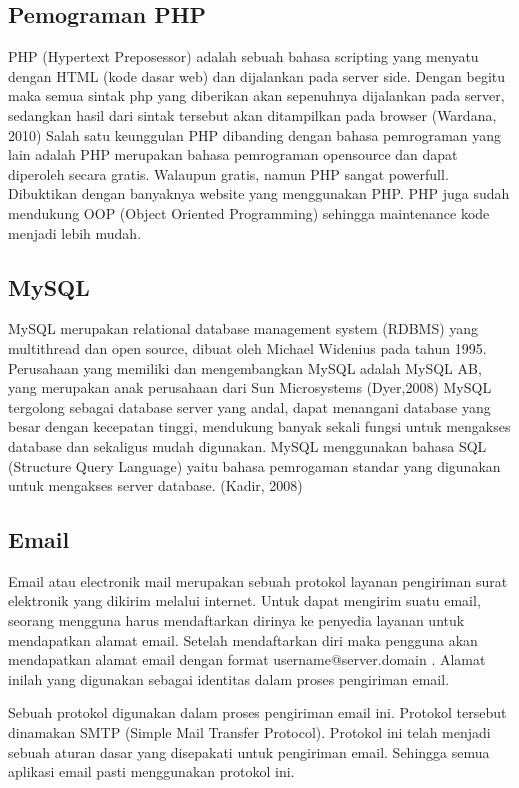 \documentclass{jtetiproposalskripsi}
\begin{document}
\subsection{Pemograman PHP}
PHP (Hypertext Preposessor) adalah sebuah bahasa scripting yang menyatu dengan HTML (kode dasar web) dan dijalankan pada server side. Dengan begitu maka semua sintak php yang diberikan akan sepenuhnya dijalankan pada server, sedangkan hasil dari sintak tersebut akan ditampilkan pada browser (Wardana, 2010) Salah satu keunggulan PHP dibanding dengan bahasa pemrograman yang lain adalah PHP merupakan bahasa pemrograman opensource dan dapat diperoleh secara gratis. Walaupun gratis, namun PHP sangat powerfull. Dibuktikan dengan banyaknya website yang menggunakan PHP. PHP juga sudah mendukung OOP (Object Oriented Programming) sehingga maintenance kode menjadi lebih mudah.


\subsection{MySQL}
MySQL merupakan relational database management system (RDBMS) yang multithread dan open source, dibuat oleh Michael Widenius pada tahun 1995. Perusahaan yang memiliki dan mengembangkan MySQL adalah MySQL AB, yang merupakan anak perusahaan dari Sun Microsystems (Dyer,2008) MySQL tergolong sebagai database server yang andal, dapat menangani database yang besar dengan kecepatan tinggi, mendukung banyak sekali fungsi untuk mengakses database dan sekaligus mudah digunakan. MySQL menggunakan bahasa SQL (Structure Query Language) yaitu bahasa pemrogaman standar yang digunakan untuk mengakses server database. (Kadir, 2008)


\subsection{Email}
Email atau electronik mail merupakan sebuah protokol layanan pengiriman surat elektronik yang dikirim melalui internet. Untuk dapat mengirim suatu email, seorang mengguna harus mendaftarkan dirinya ke penyedia layanan untuk mendapatkan alamat email. Setelah mendaftarkan diri maka pengguna akan mendapatkan alamat email dengan format username@server.domain . Alamat inilah yang digunakan sebagai identitas dalam proses pengiriman email.

Sebuah protokol digunakan dalam proses pengiriman email ini. Protokol tersebut dinamakan SMTP (Simple Mail Transfer Protocol). Protokol ini telah menjadi sebuah aturan dasar yang disepakati untuk pengiriman email. Sehingga semua aplikasi email pasti menggunakan protokol ini.
\end{document}
